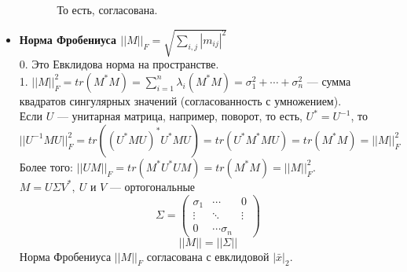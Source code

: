 \begin{itemize}
\begin{enumerate}[start=0]
\begin{itemize}
            То есть, согласована.
        \end{itemize}
    \end{enumerate}
    \item \textbf{Норма Фробениуса $||M||_F=\sqrt{\sum\limits_{i,j}|m_{ij}|^2}$}\\
    0. Это Евклидова норма на пространстве.\\
    1. $||M||_F^2=tr(M^*M)=\sum\limits_{i=1}^n\lambda_i(M^*M)=\sigma_1^2+\cdots+\sigma_n^2$ --- сумма квадратов сингулярных значений (согласованность с умножением).\\
    Если $U$ --- унитарная матрица, например, поворот, то есть, $U^*=U^{-1}$, то $$||U^{-1}MU||_F^2=tr((U^*MU)^*U^*MU)=tr(U^*M^*MU)=tr(M^*M)=||M||_F^2$$
    Более того: $||UM||_F=tr(M^*U^*UM)=tr(M^*M)=||M||_F^2$.\\
    $M=U\Sigma V^*,~U$ и $V$ --- ортогональные\\
    \[\Sigma = \begin{pmatrix}
    \sigma_1 & \cdots & 0\\
    \vdots & \ddots & \vdots\\
    0 & \cdots \sigma_n
    \end{pmatrix}\]
    $$||M||=||\Sigma||$$
    Норма Фробениуса $||M||_F$ согласована с евклидовой $|\bar x|_2$.
\end{itemize}
